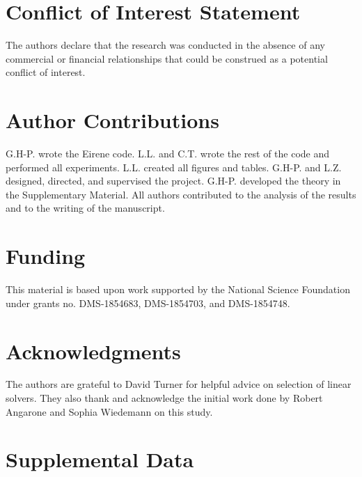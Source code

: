 





\section{Conflict of Interest Statement}

The authors declare that the research was conducted in the absence of any commercial or financial relationships that could be construed as a potential conflict of interest.

\section{Author Contributions}

G.H-P. wrote the Eirene code. L.L. and C.T. wrote the rest of the code and performed all experiments. L.L. created all figures and tables. G.H-P. and L.Z. designed, directed, and supervised the project. G.H-P. developed the theory in the Supplementary Material. All authors contributed to the analysis of the results and to the writing of the manuscript.

\section{Funding}
This material is based upon work supported by the National Science Foundation under grants no. DMS-1854683, DMS-1854703, and DMS-1854748. 

\section{Acknowledgments}
The authors are grateful to David Turner for helpful advice on selection of linear solvers. They also thank and acknowledge the initial work done by Robert Angarone and Sophia Wiedemann on this study.


\section{Supplemental Data}

